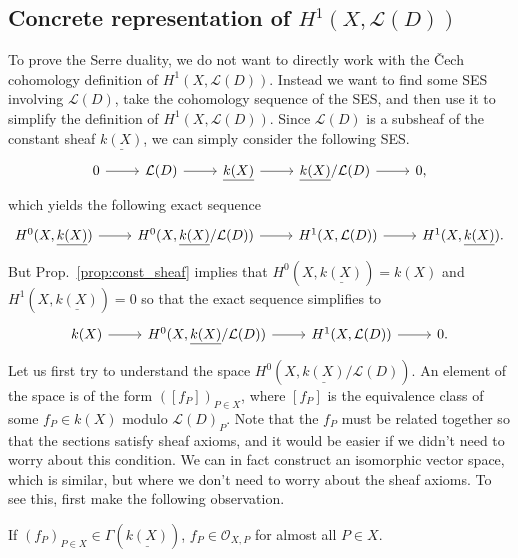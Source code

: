 \subsection{Concrete representation of $H^{1}(X,\mathcal{L}(D))$}
To prove the Serre duality, we do not want to directly work with the \v Cech
cohomology definition of $H^{1}(X,\mathcal{L}(D))$.
Instead we want to find some SES involving $\mathcal{L}(D)$,
take the cohomology sequence of the SES, and then use it to simplify
the definition of $H^{1}(X,\mathcal{L}(D))$. Since $\mathcal{L}(D)$ is
a subsheaf of the constant sheaf $\underline{k(X)}$, we can simply consider
the following SES.
\[
  \begin{tikzcd}
    0\rar & \mathcal{L}(D)\rar & \underline{k(X)}\rar
    & \underline{k(X)}/\mathcal{L}(D)\rar & 0,
  \end{tikzcd}
\]
which yields the following exact sequence
\[
  \begin{tikzcd}
    H^{0}(X,\underline{k(X)})\rar & H^{0}(X,\underline{k(X)}
    /\mathcal{L}(D))\rar & H^{1}(X,\mathcal{L}(D))\rar
    & H^{1}(X,\underline{k(X)}).
  \end{tikzcd}
\]
But Prop.~\ref{prop:const_sheaf} implies that
$H^{0}(X,\underline{k(X)})=k(X)$ and $H^{1}(X,\underline{k(X)})=0$
so that the exact sequence simplifies to
\[
  \begin{tikzcd}
    k(X)\rar & H^{0}(X,\underline{k(X)}/\mathcal{L}(D))\rar
    & H^{1}(X,\mathcal{L}(D))\rar & 0.
  \end{tikzcd}
\]
Let us first try to understand the space
$H^{0}(X,\underline{k(X)}/\mathcal{L}(D))$. An element of the space
is of the form $([f_{P}])_{P\in X}$, where $[f_{P}]$ is the equivalence
class of some $f_{P}\in k(X)$ modulo $\mathcal{L}(D)_{P}$.
Note that the $f_{P}$ must be related together so that the sections
satisfy sheaf axioms, and it would be easier if we didn't need to worry about
this condition. We can in fact construct an isomorphic vector space, which is
similar, but where we don't need to worry about the sheaf axioms. To see
this, first make the following observation.
\begin{prop}
  If $(f_{P})_{P\in X}\in \Gamma(\underline{k(X)})$,
  $f_{P}\in\mathscr{O}_{X,P}$ for almost all $P\in X$.
\end{prop}
